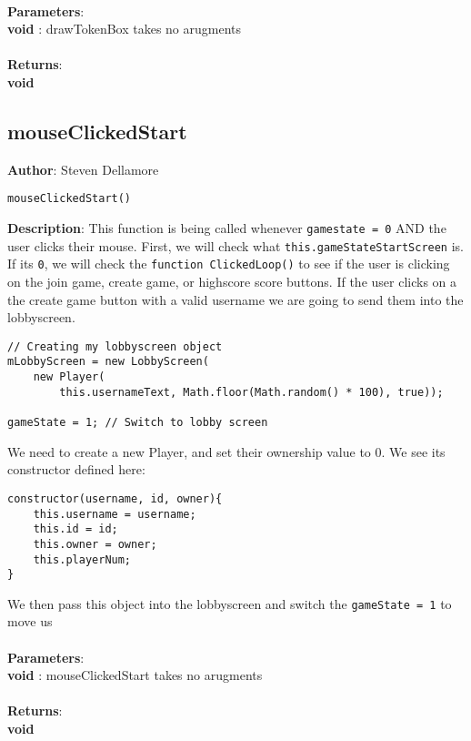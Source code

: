 \documentclass[12pt]{article}
\begin{document}
\textbf{\large{\\Parameters}}:\\
\textbf{void }: drawTokenBox takes no arugments\\\textbf{\large{\\Returns}}:\\\textbf{void}

\subsection{mouseClickedStart}
\textbf{Author}: Steven Dellamore 
\vspace*{1\baselineskip}
\begin{lstlisting}
mouseClickedStart()
\end{lstlisting} 
\vspace*{1\baselineskip}
\textbf{Description}: This function is being called whenever \texttt{gamestate = 0} AND the user clicks their mouse. First, we will check what \texttt{this.gameStateStartScreen} is. If its \texttt{0}, we will check the \texttt{function ClickedLoop()} to see if the user is clicking on the join game, create game, or highscore score buttons. If the user clicks on a the create game button with a valid username we are going to send them into the lobbyscreen. 
\begin{verbatim}
// Creating my lobbyscreen object
mLobbyScreen = new LobbyScreen(
	new Player(
		this.usernameText, Math.floor(Math.random() * 100), true));

gameState = 1; // Switch to lobby screen
\end{verbatim}
 We need to create a new Player, and set their ownership value to 0. We see its constructor defined here: 
\begin{verbatim}
constructor(username, id, owner){
    this.username = username;
    this.id = id;
    this.owner = owner;
    this.playerNum;
}
\end{verbatim}
 We then pass this object into the lobbyscreen and switch the \texttt{gameState = 1} to move us \\


\textbf{\large{\\Parameters}}:\\
\textbf{void }: mouseClickedStart takes no arugments\\\textbf{\large{\\Returns}}:\\\textbf{void}
\end{document}
